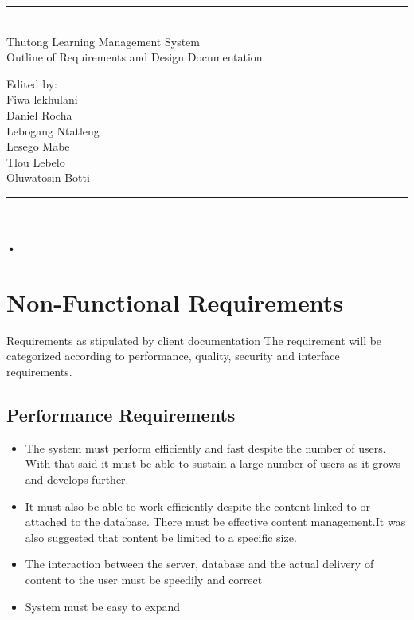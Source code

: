 \documentclass[10pt]{article}
\begin{document}
\begin{titlepage}
	\centering
	\vspace*{\fill}
	
	\vspace*{0.5cm}
	
	\huge\bfseries
	\rule{\textwidth}{1.6pt}\\[\baselineskip]
	Thutong Learning Management System \\Outline of Requirements and Design Documentation
	
	\vspace*{0.5cm}
	
	\large Edited by: \\[\baselineskip]
	
	{Fiwa lekhulani\\Daniel Rocha\\Lebogang Ntatleng\\Lesego Mabe\\Tlou Lebelo\\Oluwatosin Botti}
	
	\rule{\textwidth}{1.6pt}\\[\baselineskip]
	
	
	\vspace*{\fill}
\end{titlepage}

\newpage

\paragraph*{•}
\section*{Non-Functional Requirements} 

Requirements as stipulated by client documentation
The requirement will be categorized according to performance, quality, security and interface requirements.

\subsection*{Performance Requirements}
\begin{itemize}

\item The system must perform efficiently and fast despite the number of users. With that said it must be able to sustain a large number of users as it grows and develops further.
\item It must also be able to work efficiently despite the content linked to or attached to the database. There must be effective content management.{\newline \footnotesize It was also suggested that content be limited to a specific size.}
\item The interaction between the server, database and the actual delivery of content to the user must be speedily and correct
\item System must be easy to expand
\end{itemize}
\end{document}
